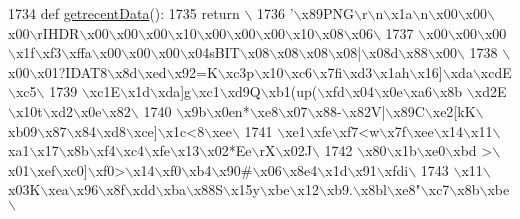 \begin{DoxyCode}
1734 \textcolor{keyword}{def }\hyperlink{namespaceimages_a9d897eaa85415fba9658c4642f1f2152}{getrecentData}():
1735     \textcolor{keywordflow}{return} \(\backslash\)
1736 \textcolor{stringliteral}{'\(\backslash\)x89PNG\(\backslash\)r\(\backslash\)n\(\backslash\)x1a\(\backslash\)n\(\backslash\)x00\(\backslash\)x00\(\backslash\)x00\(\backslash\)rIHDR\(\backslash\)x00\(\backslash\)x00\(\backslash\)x00\(\backslash\)x10\(\backslash\)x00\(\backslash\)x00\(\backslash\)x00\(\backslash\)x10\(\backslash\)x08\(\backslash\)x06\(\backslash\)}
1737 \textcolor{stringliteral}{\(\backslash\)x00\(\backslash\)x00\(\backslash\)x00\(\backslash\)x1f\(\backslash\)xf3\(\backslash\)xffa\(\backslash\)x00\(\backslash\)x00\(\backslash\)x00\(\backslash\)x04sBIT\(\backslash\)x08\(\backslash\)x08\(\backslash\)x08\(\backslash\)x08|\(\backslash\)x08d\(\backslash\)x88\(\backslash\)x00\(\backslash\)}
1738 \textcolor{stringliteral}{\(\backslash\)x00\(\backslash\)x01?IDAT8\(\backslash\)x8d\(\backslash\)xed\(\backslash\)x92=K\(\backslash\)xc3p\(\backslash\)x10\(\backslash\)xc6\(\backslash\)x7fi\(\backslash\)xd3\(\backslash\)x1ah\(\backslash\)x16]\(\backslash\)xda\(\backslash\)xcdE\(\backslash\)xc5\(\backslash\)}
1739 \textcolor{stringliteral}{\(\backslash\)xc1E\(\backslash\)x1d\(\backslash\)xda]g\(\backslash\)xc1\(\backslash\)xd9Q\(\backslash\)xb1(up(\(\backslash\)xfd\(\backslash\)x04\(\backslash\)x0e\(\backslash\)xa6\(\backslash\)x8b \(\backslash\)xd2E\(\backslash\)x10t\(\backslash\)xd2\(\backslash\)x0e\(\backslash\)x82\(\backslash\)}
1740 \textcolor{stringliteral}{\(\backslash\)x9b\(\backslash\)x0en*\(\backslash\)xe8\(\backslash\)x07\(\backslash\)x88-\(\backslash\)x82V|\(\backslash\)x89C\(\backslash\)xe2[kK\(\backslash\)xb09\(\backslash\)x87\(\backslash\)x84\(\backslash\)xd8\(\backslash\)xce]\(\backslash\)x1c<8\(\backslash\)xee\(\backslash\)}
1741 \textcolor{stringliteral}{\(\backslash\)xe1\(\backslash\)xfe\(\backslash\)xf7<w\(\backslash\)x7f\(\backslash\)xee\(\backslash\)x14\(\backslash\)x11\(\backslash\)xa1\(\backslash\)x17\(\backslash\)x8b\(\backslash\)xf4\(\backslash\)xc4\(\backslash\)xfe\(\backslash\)x13\(\backslash\)x02*Ee\(\backslash\)rX\(\backslash\)x02J\(\backslash\)}
1742 \textcolor{stringliteral}{\(\backslash\)x80\(\backslash\)x1b\(\backslash\)xe0\(\backslash\)xbd >\(\backslash\)x01\(\backslash\)xef\(\backslash\)xc0]\(\backslash\)xf0>\(\backslash\)x14\(\backslash\)xf0\(\backslash\)xb4\(\backslash\)x90#\(\backslash\)x06\(\backslash\)x8e4\(\backslash\)x1d\(\backslash\)x91\(\backslash\)xfdi\(\backslash\)}
1743 \textcolor{stringliteral}{\(\backslash\)x11\(\backslash\)x03K\(\backslash\)xea\(\backslash\)x96\(\backslash\)x8f\(\backslash\)xdd\(\backslash\)xba\(\backslash\)x88S\(\backslash\)x15y\(\backslash\)xbe\(\backslash\)x12\(\backslash\)xb9.\(\backslash\)x8bl\(\backslash\)xe8"\(\backslash\)xc7\(\backslash\)x8b\(\backslash\)xbe\(\backslash\)}

\end{DoxyCode}
